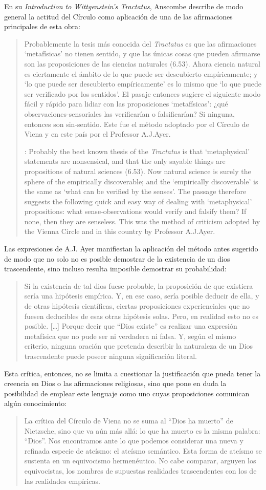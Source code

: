 En su \emph{Introduction to Wittgenstein's Tractatus}, Anscombe describe de modo
general la actitud del Círculo como aplicación de una de las afirmaciones
principales de esta obra: \blockquote[{\cite[150]{anscombe1959iwt}}: Probably
the best known thesis of the \emph{Tractatus} is that `metaphysical' statements
are nonsensical, and that the only sayable things are propositions of natural
sciences (6.53). Now natural science is surely the sphere of the empirically
discoverable; and the `empirically discoverable' is the same as `what can be
verified by the senses'. The passage therefore suggests the following quick and
easy way of dealing with `metaphysical' propositions: what sense-observations
would verify and falsify them? If none, then they are senseless. This was the
method of criticism adopted by the Vienna Circle and in this country by
Professor A.J.Ayer.]{Probablemente la tesis más conocida del \emph{Tractatus} es
  que las afirmaciones `metafísicas' no tienen sentido, y que las únicas cosas
  que pueden afirmarse son las proposiciones de las ciencias naturales (6.53).
  Ahora ciencia natural es ciertamente el ámbito de lo que puede ser descubierto
  empíricamente; y `lo que puede ser descubierto empíricamente' es lo mismo que
  `lo que puede ser verificado por los sentidos'. El pasaje entonces sugiere el
  siguiente modo fácil y rápido para lidiar con las proposiciones `metafísicas':
  ¿qué observaciones-sensoriales las verificarían o falsificarían? Si ninguna,
  entonces son sin-sentido. Este fue el método adoptado por el Círculo de Viena
  y en este país por el Professor A.J.Ayer.}

Las expresiones de A.J. Ayer manifiestan la aplicación del método antes sugerido
de modo que no solo no es posible demostrar de la existencia de un dios
trascendente, sino incluso resulta imposible demostrar su probabilidad:
\blockquote[{\cite[155]{dominguez2009at}}]{Si la existencia de tal dios fuese
  probable, la proposición de que existiera sería una hipótesis empírica. Y, en
  ese caso, sería posible deducir de ella, y de otras hipótesis científicas,
  ciertas proposiciones experienciales que no fuesen deducibles de esas otras
  hipótesis solas. Pero, en realidad esto no es posible. [\ldots] Porque decir
  que ``Dios existe'' es realizar una expresión metafísica que no pude ser ni
  verdadera ni falsa. Y, según el mismo criterio, ninguna oración que pretenda
  describir la naturaleza de un Dios trascendente puede poseer ninguna
  significación literal.} Esta crítica, entonces, no se limita a cuestionar la
justificación que pueda tener la creencia en Dios o las afirmaciones religiosas,
sino que pone en duda la posibilidad de emplear este lenguaje como uno cuyas
proposiciones comunican algún conocimiento:
\blockquote[{\cite[155]{dominguez2009at}}]{La crítica del Círculo de Viena no se
  suma al ``Dios ha muerto'' de Nietzsche, sino que va aún más allá: lo que ha
  muerto es la misma palabra: ``Dios''. Nos encontramos ante lo que podemos
  considerar una nueva y refinada especie de ateísmo: el ateísmo semántico. Esta
  forma de ateísmo se sustenta en un equivocismo hermenéutico. No cabe comparar,
  arguyen los equivocistas, los nombres de supuestas realidades trascendentes
  con los de las realidades empíricas.}

